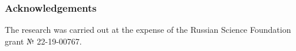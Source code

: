 \subsubsection {Acknowledgements}
The research was carried out at the expense of the Russian Science Foundation grant № 22-19-00767.
